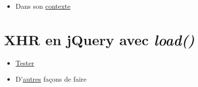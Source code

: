 \begin{itemize}
\tightlist
\item
  Dans son
  \href{http://www.xul.fr/xml-ajax.html\#ajax-exemple}{contexte}
\end{itemize}

\hypertarget{xhr-en-jquery-avec-load}{%
\section{\texorpdfstring{XHR en jQuery avec
\emph{load()}}{XHR en jQuery avec load()}}\label{xhr-en-jquery-avec-load}}

\begin{otherlanguage}{english}

\begin{Shaded}
\begin{Highlighting}[]
\DataTypeTok{>}
\AttributeTok{$}\NormalTok{(}\NormalTok{()}\OperatorTok{\{}
  \AttributeTok{$}\NormalTok{(}\NormalTok{(}\NormalTok{()}\OperatorTok{\{}
    \AttributeTok{$}\NormalTok{(}\NormalTok{(}\NormalTok{)}\OperatorTok{;}
  \OperatorTok{\}}\NormalTok{)}\OperatorTok{;}
\OperatorTok{\}}\NormalTok{)}\OperatorTok{;}

\end{Highlighting}
\end{Shaded}

\end{otherlanguage}

\begin{itemize}
\tightlist
\item
  \href{http://www.w3schools.com/jquery/tryit.asp?filename=tryjquery_ajax_load}{Tester}
\item
  D'\href{https://code.tutsplus.com/tutorials/jquery-succinctly-jquery-and-ajax--net-33856}{autres}
  façons de faire
\end{itemize}

